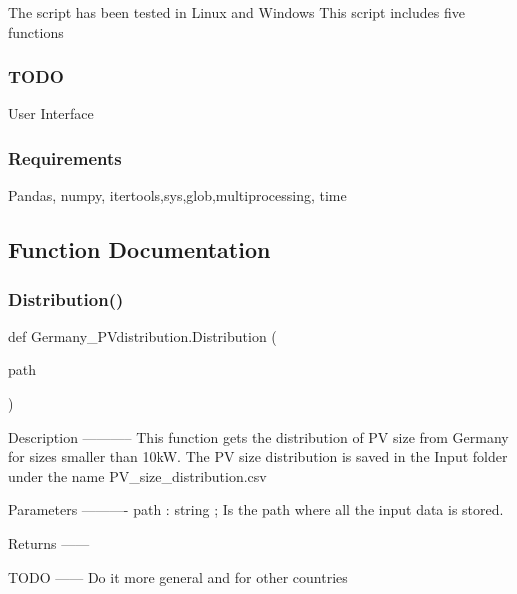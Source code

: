 The script has been tested in Linux and Windows This script includes five functions \subsubsection*{T\+O\+DO }

User Interface \subsubsection*{Requirements }

Pandas, numpy, itertools,sys,glob,multiprocessing, time 

\subsection{Function Documentation}
\mbox{\label{namespace_germany___p_vdistribution_a77ad969c1805a36ffa94e1a13d74e4a8}} 
\subsubsection{\texorpdfstring{Distribution()}{Distribution()}}
{\footnotesize\ttfamily def Germany\+\_\+\+P\+Vdistribution.\+Distribution (\begin{DoxyParamCaption}\item[{}]{path }\end{DoxyParamCaption})}

\begin{DoxyVerb}Description
-----------
This function gets the distribution of PV size from Germany for sizes smaller than 10kW. The PV size distribution is saved in the Input folder under the name PV_size_distribution.csv


Parameters
----------
path : string ; Is the path where all the input data is stored.

Returns
------

TODO
------
Do it more general and for other countries\end{DoxyVerb}
 \mbox{\label{namespace_germany___p_vdistribution_aaa5507696663fbe8f180bbdb34260a25}} 
